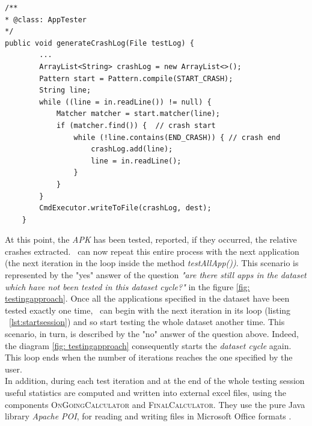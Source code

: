 \begin{lstlisting}[caption=\AppTester's method for extracting a crash log from its test log,label={lst:generatecrash}]
/**
* @class: AppTester
*/
public void generateCrashLog(File testLog) {
        ...
        ArrayList<String> crashLog = new ArrayList<>();
        Pattern start = Pattern.compile(START_CRASH);
        String line;
        while ((line = in.readLine()) != null) {
            Matcher matcher = start.matcher(line);
            if (matcher.find()) {  // crash start
                while (!line.contains(END_CRASH)) { // crash end
                    crashLog.add(line);
                    line = in.readLine();
                }
            }
        }
        CmdExecutor.writeToFile(crashLog, dest);
    }
\end{lstlisting} 
%



\hspace{-1.8em} At this point, the \textit{APK} has been tested, reported, if they occurred, the relative crashes extracted.
\toolname\ can now repeat this entire process with the next application (\ie the next iteration in the loop inside the method \textit{testAllApp())}. This scenario is represented by the "yes" answer of the question \textit{"are there still apps in the dataset which have not been tested in this dataset cycle?"} in the figure \ref{fig: testingapproach}.
Once all the applications specified in the dataset have been tested exactly one time, \SessionLauncher\ can begin with the next iteration in its loop (listing ~\ref{lst:startsession}) and so start testing the whole dataset another time. 
This scenario, in turn, is described by the "no" answer of the question above. Indeed, the diagram \ref{fig: testingapproach} consequently starts the \textit{dataset cycle} again. 
This loop ends when the number of iterations reaches the one specified by the user. \\
In addition, during each test iteration and at the end of the whole testing session useful statistics are computed and written into external excel files, using the components \textsc{OnGoingCalculator} and \textsc{FinalCalculator}. They use the pure Java library \textit{Apache POI}, for reading and writing files in Microsoft Office formats \cite{apachepoi}. 

